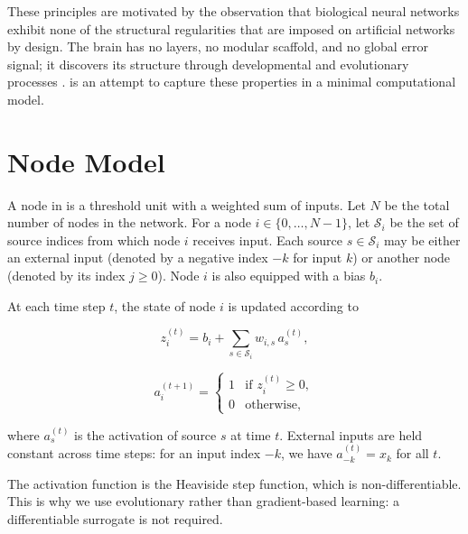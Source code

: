 These principles are motivated by the observation that biological neural
networks exhibit none of the structural regularities that are imposed on
artificial networks by design. The brain has no layers, no modular
scaffold, and no global error signal; it discovers its structure through
developmental and evolutionary processes
\citep{gershenson2012guiding, plantec2024evolving}. \modnet{} is an
attempt to capture these properties in a minimal computational model.

\section{Node Model}
\label{sec:method-node}

A node in \modnet{} is a threshold unit with a weighted sum of inputs.
Let $N$ be the total number of nodes in the network. For a node
$i \in \{0, \ldots, N-1\}$, let $\mathcal{S}_i$ be the set of source
indices from which node $i$ receives input. Each source
$s \in \mathcal{S}_i$ may be either an external input (denoted by a
negative index $-k$ for input $k$) or another node (denoted by its
index $j \geq 0$). Node $i$ is also equipped with a bias $b_i$.

At each time step $t$, the state of node $i$ is updated according to

\begin{equation}
  z_i^{(t)} = b_i + \sum_{s \in \mathcal{S}_i} w_{i,s} \, a_s^{(t)},
  \label{eq:method-pre-activation}
\end{equation}

\begin{equation}
  a_i^{(t+1)} =
  \begin{cases}
    1 & \text{if } z_i^{(t)} \geq 0, \\
    0 & \text{otherwise},
  \end{cases}
  \label{eq:method-activation}
\end{equation}

where $a_s^{(t)}$ is the activation of source $s$ at time $t$.
External inputs are held constant across time steps: for an input
index $-k$, we have $a_{-k}^{(t)} = x_k$ for all $t$.

The activation function is the Heaviside step function, which is
non-differentiable. This is why we use evolutionary rather than
gradient-based learning: a differentiable surrogate is not required.

